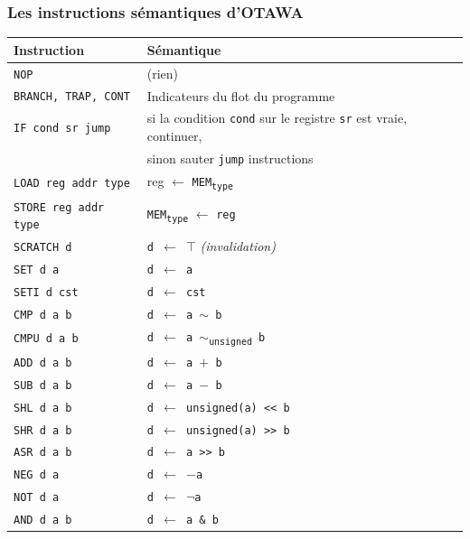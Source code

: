 \documentclass[table]{beamer}
\begin{document}
\begin{frame}[fragile]
    \frametitle{Les instructions sémantiques d'OTAWA}
    \begin{table} \tiny
	\begin{tabular}{|l|l|} \hline
	\textbf{Instruction} & \textbf{Sémantique}\\ \hline \hline
	\texttt{NOP} & (rien)\\ \hline
	\texttt{BRANCH, TRAP, CONT} & Indicateurs du flot du programme\\ \hline
	\texttt{IF cond sr jump} & si la condition \texttt{cond} sur le registre \texttt{sr} est vraie, continuer,\\
	& sinon sauter \texttt{jump} instructions\\ \hline
	\texttt{LOAD reg addr type} & reg $\leftarrow$ \texttt{MEM\textsubscript{type}} \\ \hline
	\texttt{STORE reg addr type} & \texttt{MEM\textsubscript{type}} $\leftarrow$ \texttt{reg}\\ \hline
	\texttt{SCRATCH d} & \texttt{d $\leftarrow$ $\top$} \textit{(invalidation)}\\ \hline
	\texttt{SET d a} & \texttt{d $\leftarrow$ a}\\ \hline
	\texttt{SETI d cst} & \texttt{d $\leftarrow$ cst}\\ \hline
	\texttt{CMP d a b} & \texttt{d $\leftarrow$ a $\sim$ b}\\ \hline
	\rowcolor{Gray} \texttt{CMPU d a b} & \texttt{d $\leftarrow$ a $\sim$\textsubscript{unsigned} b}\\ \hline
	\texttt{ADD d a b} & \texttt{d $\leftarrow$ a $+$ b}\\ \hline
	\texttt{SUB d a b} & \texttt{d $\leftarrow$ a $-$ b}\\ \hline
	\rowcolor{Gray} \texttt{SHL d a b} & \texttt{d $\leftarrow$ unsigned(a) <{<} b}\\ \hline
	\rowcolor{Gray} \texttt{SHR d a b} & \texttt{d $\leftarrow$ unsigned(a) >{>} b}\\ \hline
	\texttt{ASR d a b} & \texttt{d $\leftarrow$ a >{>} b}\\ \hline
	\texttt{NEG d a} & \texttt{d $\leftarrow$ $-$a}\\ \hline
	\rowcolor{Gray} \texttt{NOT d a} & \texttt{d $\leftarrow$ $\neg$a}\\ \hline
	\rowcolor{Gray} \texttt{AND d a b} & \texttt{d $\leftarrow$ a \& b}\\ \hline

\end{tabular}
\end{table}
\end{frame}
\end{document}
